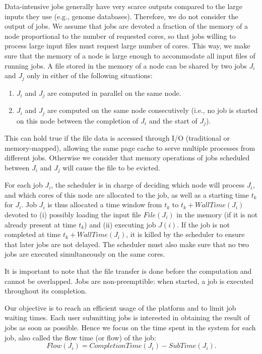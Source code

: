 \documentclass[conference]{IEEEtran}
\newcommand{\file}{\ensuremath{\mathit{File}}\xspace}
\newcommand{\memory}{\ensuremath{\mathit{M}}\xspace}
\newcommand{\submissiontime}{\mathit{SubTime}\xspace}
\newcommand{\walltime}{\mathit{WallTime}\xspace}
\newcommand{\completiontime}{\mathit{CompletionTime}\xspace}
\begin{document}
Data-intensive jobs generally have very scarce outputs compared to the large inputs they use (e.g., genome databases). 
Therefore, we do not consider the output of jobs.
We assume that jobs are
devoted a fraction of the memory of a node proportional to the number of
requested cores, so that jobs willing to process large input files
must request large number of cores. This way, we make sure that the
memory of a node is large enough to accommodate all input files of running jobs.
A file stored in the memory of a node can be shared by two jobs $J_i$
and $J_j$ only in either of the following situations:
\begin{enumerate}
	\item $J_i$ and $J_j$ are computed in parallel on the same node.
	\item $J_i$ and $J_j$ are computed on the same node
          consecutively (i.e., no job is started on this node between the
          completion of $J_i$ and the start of $J_j$).
\end{enumerate}
This can hold true if the file data is accessed through I/O (traditional or memory-mapped),
allowing the same page cache to serve multiple processes from different jobs.
Otherwise we consider that memory operations of jobs scheduled between
$J_i$ and $J_j$ will cause the file to be evicted.


For each job $J_i$, the scheduler is in charge of deciding which node
will process $J_i$, and which cores of this node
are allocated to the job, as well as a starting time $t_k$ for $J_i$. Job
$J_i$ is thus allocated a time window from $t_k$ to
$t_k+\walltime(J_i)$ devoted to (i) possibly loading the input file
$\file(J_i)$ in the memory (if it is not already present at time
$t_k$) and (ii) executing job $J(i)$. If the job is not completed at
time $t_k+\walltime(J_i)$, it is killed by the scheduler to ensure
that later jobs are not delayed.  The scheduler must also make sure
that no two jobs are executed simultaneously on the same cores.

It is important to note that the file transfer is done before the computation and cannot be overlapped.
Jobs are non-preemptible: when started, a job is executed throughout its completion.

Our objective is to reach an efficient usage of the platform and to
limit job waiting times. Each
user submitting jobs is interested in obtaining the result of jobs
as soon as possible. Hence we focus on the time spent in the system
for each job, also called the flow time (or flow) of the job:
$$
\mathit{Flow}(J_i) = \completiontime(J_i) - \submissiontime(J_i).
$$
\end{document}
